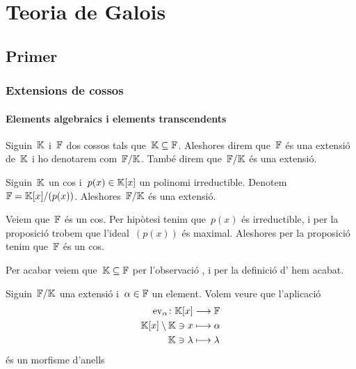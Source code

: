 \documentclass[../Apunts.tex]{subfiles}
\begin{document}
\part{Teoria de Galois}
\chapter[Capítol primer]{Primer}
\section{Extensions de cossos}
\subsection{Elements algebraics i elements transcendents}
	\begin{definition}
		\label{def:extensió d'un cos}
		Siguin~\(\mathbb{K}\) i~\(\mathbb{F}\) dos cossos tals que~\(\mathbb{K}\subseteq\mathbb{F}\). Aleshores direm que~\(\mathbb{F}\) és una extensió de~\(\mathbb{K}\) i ho denotarem com~\(\mathbb{F}/\mathbb{K}\). També direm que~\(\mathbb{F}/\mathbb{K}\) és una extensió.
	\end{definition}
	\begin{example}
		\label{ex:el cos de polinomis és una extensió}
		Siguin~\(\mathbb{K}\) un cos i~\(p(x)\in\mathbb{K}[x]\) un polinomi irreductible. Denotem~\(\mathbb{F}=\mathbb{K}[x]/(p(x))\). Aleshores~\(\mathbb{F}/\mathbb{K}\) és una extensió.
		\begin{solution} %
			Veiem que~\(\mathbb{F}\) és un cos. Per hipòtesi tenim que~\(p(x)\) és irreductible, i per la proposició  trobem que l'ideal~\((p(x))\) és maximal. Aleshores per la proposició  tenim que~\(\mathbb{F}\) és un cos.
			
			Per acabar veiem que~\(\mathbb{K}\subseteq\mathbb{F}\) per l'observació , i per la definició d' hem acabat.
		\end{solution}
	\end{example}
	\begin{example}
		\labelname{\empty}
		\label{ex:el morfisme avaluació és un morfisme d'anells}
		Siguin~\(\mathbb{F}/\mathbb{K}\) una extensió i~\(\alpha\in\mathbb{F}\) un element. Volem veure que l'aplicació
		\begin{align*}
			\mathrm{ev}_{\alpha}\colon\mathbb{K}[x]&\longrightarrow\mathbb{F} \\
			\mathbb{K}[x]\setminus\mathbb{K}\ni x&\longmapsto\alpha \\
			\mathbb{K}\ni\lambda&\longmapsto\lambda
		\end{align*}
		és un morfisme d'anells
		\begin{solution}
		\end{solution}
	\end{example}
\end{document}
